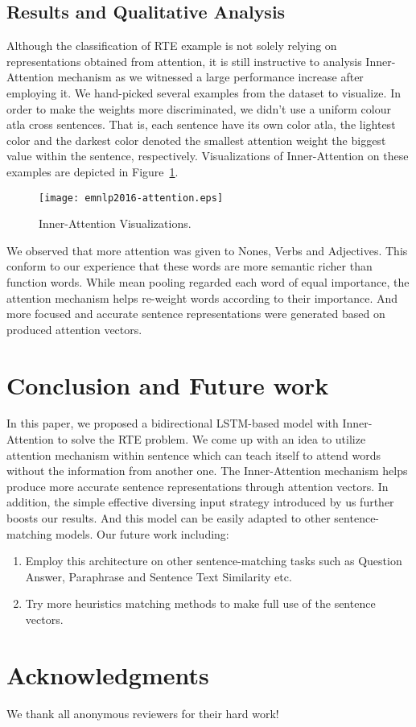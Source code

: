 \documentclass[11pt,letterpaper]{article}
\begin{document}
\subsection{Results and Qualitative Analysis}
Although the classification of RTE example is not solely relying on representations obtained from attention, it is still instructive to analysis Inner-Attention mechanism as we witnessed a large performance increase after employing it. We hand-picked several examples from the dataset to visualize. In order to make the weights more discriminated, we didn't use a uniform colour atla cross sentences. That is, each sentence have its own color atla, the lightest color and the darkest color denoted the smallest attention weight the biggest value within the sentence, respectively. Visualizations of Inner-Attention on these examples are depicted in Figure~\ref{VisAtt}.
\begin{figure}[htbp]
  \centering
  \texttt{[image: emnlp2016-attention.eps]}
  \caption{Inner-Attention Visualizations.}
  \label{VisAtt}
\end{figure}

We observed that more attention was given to Nones, Verbs and Adjectives. This conform to our experience that these words are more semantic richer than function words. While mean pooling regarded each word of equal importance, the attention mechanism helps re-weight words according to their importance. And more focused and accurate sentence representations were generated based on produced attention vectors.


\section{Conclusion and Future work}
In this paper, we proposed a bidirectional LSTM-based model with Inner-Attention to solve the RTE problem. We come up with an idea to utilize attention mechanism within sentence which can teach itself to attend words without the information from another one. The Inner-Attention mechanism helps produce more accurate sentence representations through attention vectors. In addition, the simple effective diversing input strategy introduced by us further boosts our results. And this model can be easily adapted to other sentence-matching models.
Our future work including:
\begin{enumerate}
\setlength{\itemsep}{0pt}
\setlength{\parsep}{0pt}
\setlength{\parskip}{0pt}
\item Employ this architecture on other sentence-matching tasks such as Question Answer, Paraphrase and Sentence Text Similarity etc.
\item Try more heuristics matching methods to make full use of the sentence vectors.
\end{enumerate}
\section*{Acknowledgments}
We thank all anonymous reviewers for their hard work!



\end{document}
